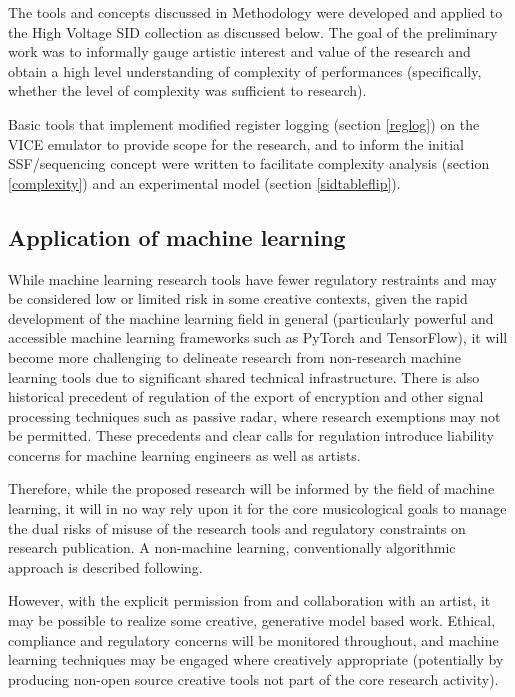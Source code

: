 \documentclass[10pt]{article}
\begin{document}
\begin{multicols*}{2}
The tools and concepts discussed in Methodology were developed and applied to the High Voltage SID collection as discussed below. The goal of the preliminary work was to informally gauge artistic interest and value of the research and obtain a high level understanding of complexity of performances (specifically, whether the level of complexity was sufficient to research).

Basic tools that implement modified register logging (section \ref{reglog}) on the VICE emulator\cite{asidvice} to provide scope for the research, and to inform the initial SSF/sequencing concept were written to facilitate complexity analysis (section \ref{complexity}) and an experimental model (section \ref{sidtableflip}).

\subsection{Application of machine learning}

While machine learning research tools have fewer regulatory restraints and may be considered low or limited risk in some creative contexts, given the rapid development of the machine learning field in general (particularly powerful and accessible machine learning frameworks such as PyTorch and TensorFlow), it will become more challenging to delineate research from non-research machine learning tools due to significant shared technical infrastructure. There is also historical precedent of regulation of the export of encryption and other signal processing techniques such as passive radar\cite{munitions}, where research exemptions may not be permitted. These precedents and clear calls for regulation introduce liability concerns for machine learning engineers as well as artists.

Therefore, while the proposed research will be informed by the field of machine learning, it will in no way rely upon it for the core musicological goals to manage the dual risks of misuse of the research tools and regulatory constraints on research publication. A non-machine learning, conventionally algorithmic approach is described following.

However, with the explicit permission from and collaboration with an artist, it may be possible to realize some creative, generative model based work. Ethical, compliance and regulatory concerns will be monitored throughout, and machine learning techniques may be engaged where creatively appropriate (potentially by producing non-open source creative tools not part of the core research activity).


\end{multicols*}
\end{document}

